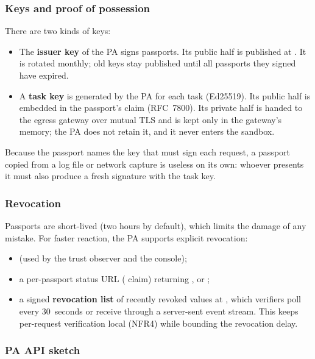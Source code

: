 \subsubsection{Keys and proof of possession}

There are two kinds of keys:

\begin{itemize}
  \item The \textbf{issuer key} of the PA signs passports. Its public half is published at . It is rotated monthly; old keys stay published until all passports they signed have expired.
  \item A \textbf{task key} is generated by the PA for each task (Ed25519). Its public half is embedded in the passport's  claim (RFC~7800). Its private half is handed to the egress gateway over mutual TLS and is kept only in the gateway's memory; the PA does not retain it, and it never enters the sandbox.
\end{itemize}

Because the passport names the key that must sign each request, a passport copied from a log file or network capture is useless on its own: whoever presents it must also produce a fresh signature with the task key.

\subsubsection{Revocation}

Passports are short-lived (two hours by default), which limits the damage of any mistake. For faster reaction, the PA supports explicit revocation:

\begin{itemize}
  \item {} (used by the trust observer and the console);
  \item a per-passport status URL ( claim) returning ,  or ;
  \item a signed \textbf{revocation list} of recently revoked  values at , which verifiers poll every 30~seconds or receive through a server-sent event stream. This keeps per-request verification local (NFR4) while bounding the revocation delay.
\end{itemize}

\subsubsection{PA API sketch}

